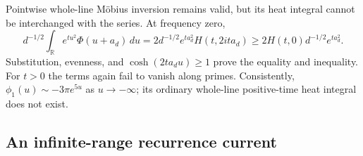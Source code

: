 \documentclass[11pt]{article}
\numberwithin{equation}{section}
\theoremstyle{definition}
\theoremstyle{remark}
\newcommand{\R}{\mathbb R}
\begin{document}
Pointwise whole-line M\"obius inversion remains valid, but its heat
integral cannot be interchanged with the series. At frequency zero,
\begin{equation}
 d^{-1/2}\int_{\R}e^{tu^2}\Phi(u+a_d)\,du
 =2d^{-1/2}e^{ta_d^2}H(t,2ita_d)
 \ge2H(t,0)d^{-1/2}e^{ta_d^2}.
 \label{dil:whole-line-growth}
\end{equation}
Substitution, evenness, and $\cosh(2ta_du)\ge1$ prove the equality and
inequality. For $t>0$ the terms again fail to vanish along primes.
Consistently, $\phi_1(u)\sim-3\pi e^{5u}$ as $u\to-\infty$;
its ordinary whole-line positive-time heat integral does not exist.

\subsection{An infinite-range recurrence current}
\label{nonlocal:massive}
\end{document}
